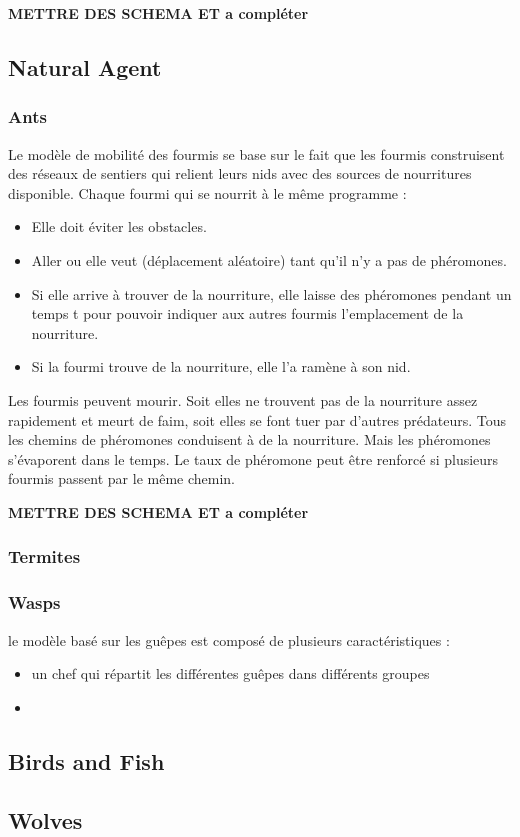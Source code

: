 \textbf{METTRE DES SCHEMA ET a compléter}

\subsection{Natural Agent}

\subsubsection{Ants}

Le modèle de mobilité des fourmis se base sur le fait que les fourmis construisent des réseaux de sentiers qui relient leurs   nids avec des sources de nourritures disponible.
Chaque fourmi qui se nourrit à le même programme :

\begin{itemize}
\item Elle doit éviter les obstacles.
\item Aller ou elle veut (déplacement aléatoire) tant qu'il n'y a pas de phéromones.
\item Si elle arrive à trouver de la nourriture, elle laisse des phéromones pendant un temps t pour pouvoir indiquer aux autres fourmis l'emplacement de la nourriture.
\item Si la fourmi trouve de la nourriture, elle l'a ramène à son nid.
\end{itemize}

Les fourmis peuvent mourir. Soit elles ne trouvent pas de la nourriture assez rapidement et meurt de faim, soit elles se font tuer par d'autres prédateurs.
Tous les chemins de phéromones conduisent à de la nourriture. Mais les phéromones s'évaporent dans le temps. Le taux de phéromone peut être renforcé si plusieurs fourmis passent par le même chemin.

\textbf{METTRE DES SCHEMA ET a compléter}

\subsubsection{Termites}

\subsubsection{Wasps}

le modèle basé sur les guêpes est composé de plusieurs caractéristiques :
\begin{itemize}
\item un chef qui répartit les différentes guêpes dans différents groupes
\item 
\end{itemize}

\subsection{Birds and Fish}

\subsection{Wolves}

 